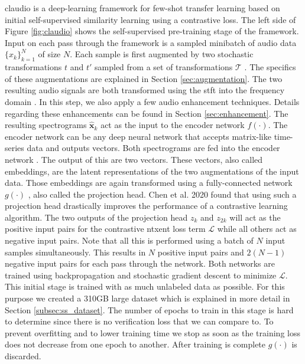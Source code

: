 \gls{claudio} is a deep-learning framework for few-shot transfer learning based on initial self-supervised similarity learning using a contrastive loss. The left side of Figure \ref{fig:claudio} shows the self-supervised pre-training stage of the framework. Input on each pass through the framework is a sampled minibatch of audio data $\{x_k\}_{k=1}^N$ of size $N$. Each sample is first augmented by two stochastic transformations $t$ and $t'$ sampled from a set of transformations $\mathcal{T}$ . The specifics of these augmentations are explained in Section \ref{sec:augmentation}. The two resulting audio signals are both transformed using the \gls{stft} into the frequency domain . In this step, we also apply a few audio enhancement techniques. Details regarding these enhancements can be found in Section \ref{sec:enhancement}. The resulting spectrograms $\hat{\boldsymbol{x}}_k$ act as the input to the encoder network $f(\cdot)$. The encoder network can be any deep neural network that accepts matrix-like time-series data and outputs vectors. Both spectrograms are fed into the encoder network . The output of this are two vectors. These vectors, also called embeddings, are the latent representations of the two augmentations of the input data. Those embeddings are again transformed using a fully-connected network $g(\cdot)$ , also called the projection head. Chen et al. 2020 \cite{chen2020simple} found that using such a projection head drastically improves the performance of a contrastive learning algorithm. The two outputs of the projection head $z_k$ and $z_{2k}$ will act as the positive input pairs for the contrastive \gls{ntxent} loss term $\mathcal{L}$  while all others act as negative input pairs. Note that all this is performed using a batch of $N$ input samples simultaneously. This results in $N$ positive input pairs and $2(N-1)$ negative input pairs for each pass through the network. Both networks are trained using backpropagation and stochastic gradient descent to minimize $\mathcal{L}$. This initial stage is trained with as much unlabeled data as possible. For this purpose we created a 310GB large dataset which is explained in more detail in Section \ref{subsec:ss_dataset}. The number of epochs to train in this stage is hard to determine since there is no verification loss that we can compare to. To prevent overfitting and to lower training time we stop as soon as the training loss does not decrease from one epoch to another. After training is complete $g(\cdot)$ is discarded.

